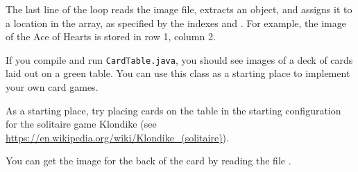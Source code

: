 \begin{exercise}
The last line of the loop reads the image file, extracts an  object, and assigns it to a location in the array, as specified by the indexes  and .
For example, the image of the Ace of Hearts is stored in row 1, column 2.

If you compile and run {\tt CardTable.java}, you should see images of a deck of cards laid out on a green table.
You can use this class as a starting place to implement your own card games.



As a starting place, try placing cards on the table in the starting configuration for the solitaire game Klondike (see \url{https://en.wikipedia.org/wiki/Klondike_(solitaire)}).

You can get the image for the back of the card by reading the file .

\end{exercise}

